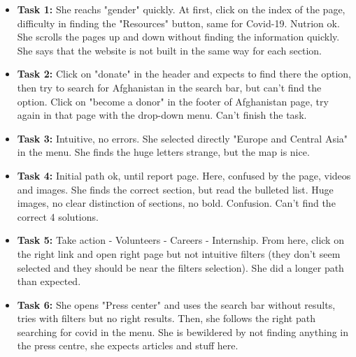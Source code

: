 \begin{itemize}
    \item \textbf{Task 1:} She reachs "gender" quickly. At first, click on the index of the page, difficulty in finding the "Resources" button, same for Covid-19. Nutrion ok. She scrolls the pages up and down without finding the information quickly. She says that the website is not built in the same way for each section.
    \item \textbf{Task 2:} Click on "donate" in the header and expects to find there the option, then try to search for Afghanistan in the search bar, but can't find the option. Click on "become a donor" in the footer of Afghanistan page, try again in that page with the drop-down menu. Can't finish the task.
    \item \textbf{Task 3:} Intuitive, no errors. She selected directly "Europe and Central Asia" in the menu. She finds the huge letters strange, but the map is nice.
    \item \textbf{Task 4:} Initial path ok, until report page. Here, confused by the page, videos and images. She finds the correct section, but read the bulleted list. Huge images, no clear distinction of sections, no bold. Confusion. Can't find the correct 4 solutions.
    \item \textbf{Task 5:} Take action - Volunteers - Careers - Internship. From here, click on the right link and open right page but not intuitive filters (they don't seem selected and they should be near the filters selection). She did a longer path than expected.
    \item \textbf{Task 6:} She opens "Press center" and uses the search bar without results, tries with filters but no right results. Then, she follows the right path searching for covid in the menu. She is bewildered by not finding anything in the press centre, she expects articles and stuff here.
\end{itemize}



\vspace{1cm}

